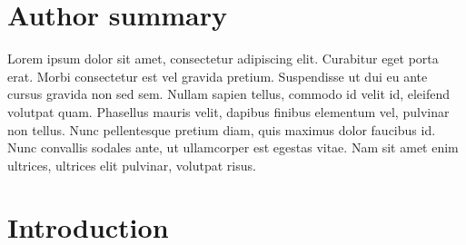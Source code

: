 \documentclass[10pt,letterpaper]{article}
\begin{document}
\section*{Author summary}
Lorem ipsum dolor sit amet, consectetur adipiscing elit. Curabitur eget porta erat. Morbi consectetur est vel gravida pretium. Suspendisse ut dui eu ante cursus gravida non sed sem. Nullam sapien tellus, commodo id velit id, eleifend volutpat quam. Phasellus mauris velit, dapibus finibus elementum vel, pulvinar non tellus. Nunc pellentesque pretium diam, quis maximus dolor faucibus id. Nunc convallis sodales ante, ut ullamcorper est egestas vitae. Nam sit amet enim ultrices, ultrices elit pulvinar, volutpat risus.

\linenumbers

\section*{Introduction}



%

\end{document}
